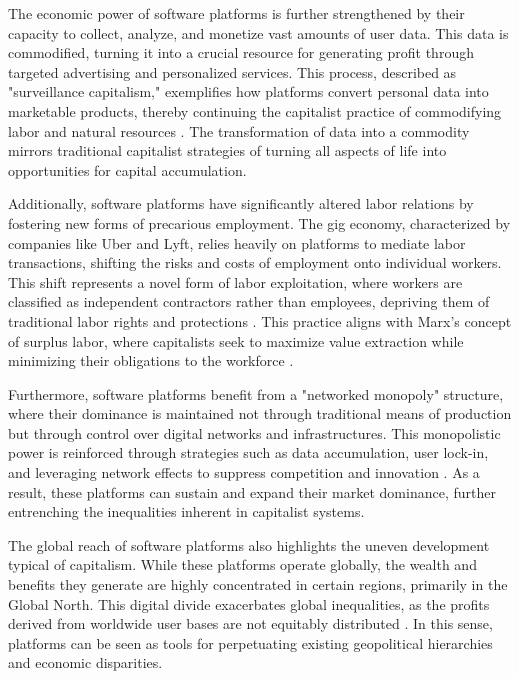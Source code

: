 \begin{refsection}
The economic power of software platforms is further strengthened by their capacity to collect, analyze, and monetize vast amounts of user data. This data is commodified, turning it into a crucial resource for generating profit through targeted advertising and personalized services. This process, described as "surveillance capitalism," exemplifies how platforms convert personal data into marketable products, thereby continuing the capitalist practice of commodifying labor and natural resources \cite[pp.~163-165]{zuboff2020age}. The transformation of data into a commodity mirrors traditional capitalist strategies of turning all aspects of life into opportunities for capital accumulation.

Additionally, software platforms have significantly altered labor relations by fostering new forms of precarious employment. The gig economy, characterized by companies like Uber and Lyft, relies heavily on platforms to mediate labor transactions, shifting the risks and costs of employment onto individual workers. This shift represents a novel form of labor exploitation, where workers are classified as independent contractors rather than employees, depriving them of traditional labor rights and protections \cite[pp.~36-38]{scholz2016uberworked}. This practice aligns with Marx’s concept of surplus labor, where capitalists seek to maximize value extraction while minimizing their obligations to the workforce \cite[pp.~644-646]{marx2008capital}.

Furthermore, software platforms benefit from a "networked monopoly" structure, where their dominance is maintained not through traditional means of production but through control over digital networks and infrastructures. This monopolistic power is reinforced through strategies such as data accumulation, user lock-in, and leveraging network effects to suppress competition and innovation \cite[pp.~18-20]{mcchesney2013digitaldisconnect}. As a result, these platforms can sustain and expand their market dominance, further entrenching the inequalities inherent in capitalist systems.

The global reach of software platforms also highlights the uneven development typical of capitalism. While these platforms operate globally, the wealth and benefits they generate are highly concentrated in certain regions, primarily in the Global North. This digital divide exacerbates global inequalities, as the profits derived from worldwide user bases are not equitably distributed \cite[pp.~109-112]{schiller2014digital}. In this sense, platforms can be seen as tools for perpetuating existing geopolitical hierarchies and economic disparities.


\end{refsection}
